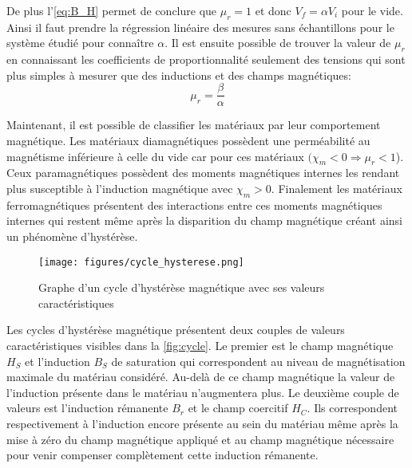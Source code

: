 De plus l'\autoref{eq:B_H} permet de conclure que \(\mu_r = 1\) et donc \(V_f = \alpha V_i\) pour le vide. Ainsi il faut prendre la régression linéaire des mesures sans échantillons pour le système étudié pour connaître \(\alpha\). Il est ensuite possible de trouver la valeur de \(\mu_r\) en connaissant les coefficients de proportionnalité seulement des tensions qui sont plus simples à mesurer que des inductions et des champs magnétiques:
\begin{equation} 
    \mu_r = \frac{\beta}{\alpha}
    \label{eq:mu_r}
\end{equation} 


Maintenant, il est possible de classifier les matériaux par leur comportement magnétique. Les matériaux diamagnétiques possèdent une perméabilité au magnétisme inférieure à celle du vide car pour ces matériaux \((\chi_m < 0 \Rightarrow \mu_r < 1\)). Ceux paramagnétiques possèdent des moments magnétiques internes les rendant plus susceptible à l'induction magnétique avec \(\chi_m > 0\). Finalement les matériaux ferromagnétiques présentent des interactions entre ces moments magnétiques internes qui restent même après la disparition du champ magnétique créant ainsi un phénomène d'hystérèse.

\begin{wrapfigure}{R}{0.6\textwidth}
    \centering
    \texttt{[image: figures/cycle\_hysterese.png]}
    \caption{Graphe d'un cycle d'hystérèse magnétique avec ses valeurs caractéristiques \cite{graph_cycle}}
    \label{fig:cycle}
\end{wrapfigure}
Les cycles d'hystérèse magnétique présentent deux couples de valeurs caractéristiques visibles dans la \autoref{fig:cycle}. Le premier est le champ magnétique \(H_S\) et l'induction \(B_S\) de saturation qui correspondent au niveau de magnétisation maximale du matériau considéré. Au-delà de ce champ magnétique la valeur de l'induction présente dans le matériau n'augmentera plus. Le deuxième couple de valeurs est l'induction rémanente \(B_r\) et le champ coercitif \(H_C\). Ils correspondent respectivement à l'induction encore présente au sein du matériau même après la mise à zéro du champ magnétique appliqué et au champ magnétique nécessaire pour venir compenser complètement cette induction rémanente.